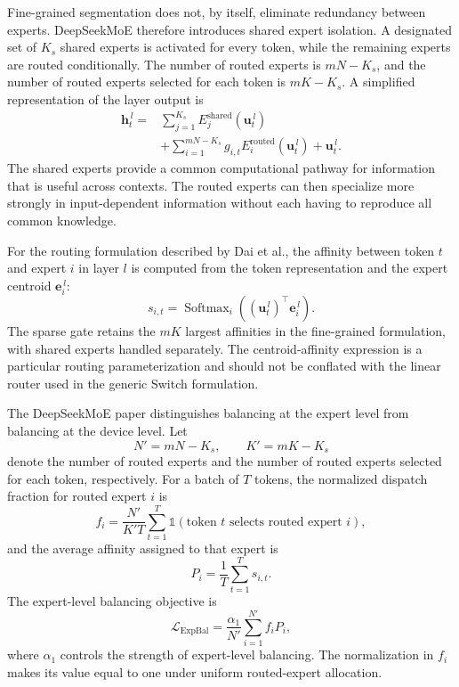 Fine-grained segmentation does not, by itself, eliminate redundancy
between experts. DeepSeekMoE therefore introduces shared expert
isolation. A designated set of \(K_s\) shared experts is activated for
every token, while the remaining experts are routed conditionally.
The number of routed experts is \(mN-K_s\), and the number of routed
experts selected for each token is \(mK-K_s\). A simplified
representation of the layer output is
\begin{align}
    \mathbf{h}_{t}^{\,l}
    ={}&
    \sum_{j=1}^{K_s}
    E^{\mathrm{shared}}_j
    \left(\mathbf{u}_{t}^{\,l}\right)
    \nonumber\\
    &+
    \sum_{i=1}^{mN-K_s}
    g_{i,t}
    E^{\mathrm{routed}}_i
    \left(\mathbf{u}_{t}^{\,l}\right)
    +
    \mathbf{u}_{t}^{\,l}.
    \label{eq:deepseek-shared-routed}
\end{align}
The shared experts provide a common computational pathway for
information that is useful across contexts. The routed experts can
then specialize more strongly in input-dependent information without
each having to reproduce all common knowledge.

For the routing formulation described by Dai et al., the affinity
between token \(t\) and expert \(i\) in layer \(l\) is computed from
the token representation and the expert centroid
\(\mathbf{e}_{i}^{\,l}\):
\begin{equation}
    s_{i,t}
    =
    \operatorname{Softmax}_{i}
    \left(
        (\mathbf{u}_{t}^{\,l})^{\top}\mathbf{e}_{i}^{\,l}
    \right).
    \label{eq:deepseek-centroid-affinity}
\end{equation}
The sparse gate retains the \(mK\) largest affinities in the
fine-grained formulation, with shared experts handled separately.
The centroid-affinity expression is a particular routing
parameterization and should not be conflated with the linear router
used in the generic Switch formulation.

The DeepSeekMoE paper distinguishes balancing at the expert level
from balancing at the device level. Let
\[
    N'=mN-K_s,
    \qquad
    K'=mK-K_s
\]
denote the number of routed experts and the number of routed experts
selected for each token, respectively. For a batch of \(T\) tokens,
the normalized dispatch fraction for routed expert \(i\) is
\begin{equation}
    f_i
    =
    \frac{N'}{K'T}
    \sum_{t=1}^{T}
    \mathbb{1}
    \left(\text{token }t\text{ selects routed expert }i\right),
    \label{eq:deepseek-expert-dispatch}
\end{equation}
and the average affinity assigned to that expert is
\begin{equation}
    P_i
    =
    \frac{1}{T}\sum_{t=1}^{T}s_{i,t}.
    \label{eq:deepseek-expert-affinity}
\end{equation}
The expert-level balancing objective is
\begin{equation}
    \mathcal{L}_{\mathrm{ExpBal}}
    =
    \frac{\alpha_1}{N'}
    \sum_{i=1}^{N'}f_iP_i,
    \label{eq:deepseek-expert-balance}
\end{equation}
where \(\alpha_1\) controls the strength of expert-level balancing.
The normalization in \(f_i\) makes its value equal to one under
uniform routed-expert allocation.

